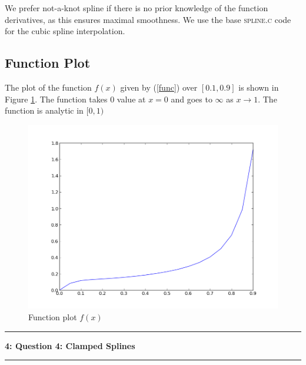 \documentclass[11pt]{article}
\newcommand\question[2]{\vspace{.25in}\hrule\textbf{#1: #2}\vspace{.5em}\hrule\vspace{.10in}}
\begin{document}
We prefer not-a-knot spline if there is no prior knowledge of the function derivatives, as this ensures maximal smoothness. We use the base \textsc{spline.c} code for the cubic spline interpolation.

\subsection{Function Plot}

The plot of the function $f(x)$ given by (\ref{func}) over $[0.1,0.9]$ is shown in Figure \ref{q1:func}. The function takes $0$ value at $x=0$ and goes to $\infty$ as $x \to 1$. The function is analytic in $[0,1)$


\begin{figure}
\centering
\includegraphics[width=0.5\linewidth]{q1-q2/func.png}
\caption{Function plot $f(x)$}
\label{q1:func}
\end{figure}

\question{4}{Question 4: Clamped Splines} 
\setcounter{section}{4}
\end{document}
